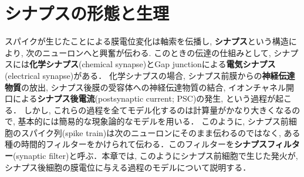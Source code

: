 \section{シナプスの形態と生理}
スパイクが生じたことによる膜電位変化は軸索を伝播し, \textbf{シナプス}という構造により, 次のニューロンへと興奮が伝わる. このときの伝達の仕組みとして, シナプスには\textbf{化学シナプス}(chemical synapse)とGap junctionによる\textbf{電気シナプス}(electrical synapse)がある．  
化学シナプスの場合, シナプス前膜からの\textbf{神経伝達物質}の放出, シナプス後膜の受容体への神経伝達物質の結合, イオンチャネル開口による\textbf{シナプス後電流}(postsynaptic current; PSC)の発生, という過程が起こる．
しかし, これらの過程を全てモデル化するのは計算量がかなり大きくなるので, 基本的には簡易的な現象論的なモデルを用いる．
このように, シナプス前細胞のスパイク列(spike train)は次のニューロンにそのまま伝わるのではなく, ある種の時間的フィルターをかけられて伝わる．このフィルターを\textbf{シナプスフィルター}(synaptic filter)と呼ぶ．本章では, このようにシナプス前細胞で生じた発火が, シナプス後細胞の膜電位に与える過程のモデルについて説明する．
